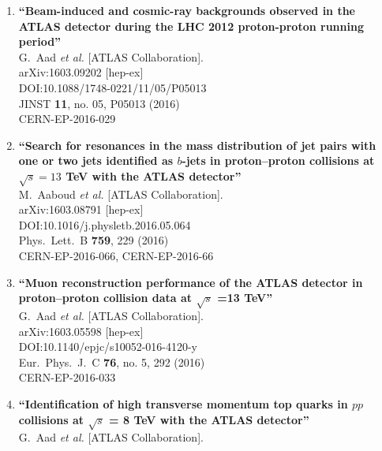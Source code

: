\documentclass{article}
\begin{document}
\begin{enumerate}
\item%
{\bf ``Beam-induced and cosmic-ray backgrounds observed in the ATLAS detector during the LHC 2012 proton-proton running period''}
  \\{}G.~Aad {\it et al.} [ATLAS Collaboration].
  \\{}arXiv:1603.09202 [hep-ex]
  \\{}DOI:10.1088/1748-0221/11/05/P05013
  \\{}JINST {\bf 11}, no. 05, P05013 (2016)
  \\{}CERN-EP-2016-029

\item%
{\bf ``Search for resonances in the mass distribution of jet pairs with one or two jets identified as $b$-jets in proton--proton collisions at $\sqrt{s}=13$ TeV with the ATLAS detector''}
  \\{}M.~Aaboud {\it et al.} [ATLAS Collaboration].
  \\{}arXiv:1603.08791 [hep-ex]
  \\{}DOI:10.1016/j.physletb.2016.05.064
  \\{}Phys.\ Lett.\ B {\bf 759}, 229 (2016)
  \\{}CERN-EP-2016-066, CERN-EP-2016-66
\item%
{\bf ``Muon reconstruction performance of the ATLAS detector in proton–proton collision data at $\sqrt{s}$ =13 TeV''}
  \\{}G.~Aad {\it et al.} [ATLAS Collaboration].
  \\{}arXiv:1603.05598 [hep-ex]
  \\{}DOI:10.1140/epjc/s10052-016-4120-y
  \\{}Eur.\ Phys.\ J.\ C {\bf 76}, no. 5, 292 (2016)
  \\{}CERN-EP-2016-033
\item%
{\bf ``Identification of high transverse momentum top quarks in $pp$ collisions at $\sqrt{s}$ = 8 TeV with the ATLAS detector''}
  \\{}G.~Aad {\it et al.} [ATLAS Collaboration].

\end{enumerate}
\end{document}
